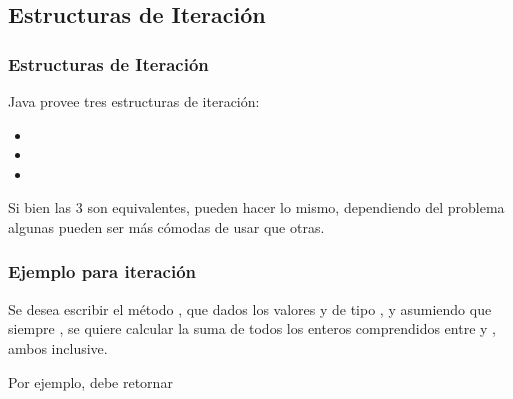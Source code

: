\documentclass{beamer}
\begin{document}
\subsection{Estructuras de Iteración}

\begin{frame}
  \frametitle{Estructuras de Iteración}

  Java provee tres estructuras de iteración:
  
  \begin{itemize}
  \item {}
  \item {}
  \item {}
  \end{itemize}

  Si bien las 3 son equivalentes, pueden hacer lo mismo, dependiendo
  del problema algunas pueden ser más cómodas de usar que otras.
  
\end{frame}

\begin{frame}
  \frametitle{Ejemplo para iteración}

  \begin{block}{}
    Se desea escribir el método , que dados los
    valores  y  de tipo , y asumiendo que
    siempre , se quiere calcular la suma de todos los
    enteros comprendidos entre  y , ambos inclusive.
  \end{block}

  \begin{exampleblock}{}
    Por ejemplo,  debe retornar   
  \end{exampleblock}

\end{frame}
\end{document}
